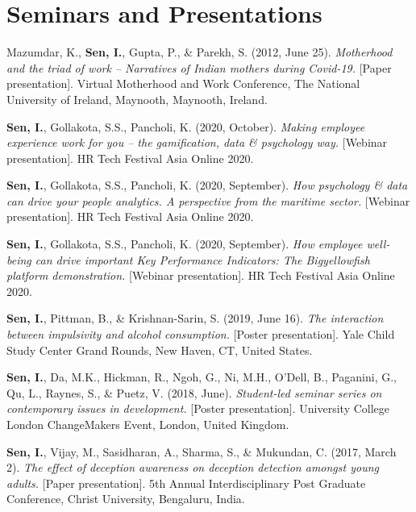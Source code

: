 \documentclass[a4paper,11pt]{article}
\begin{document}
\section{\textbf{Seminars and Presentations}}
\vspace{0.2mm}
\small{
  \begin{enumerate}[leftmargin=*, labelsep=0.5em, align=left, widest={[\textbf{S.1}]}, itemindent=0em, label={\textbf{[\arabic*]}}]
    \item Mazumdar, K., \textbf{Sen, I.}, Gupta, P., \& Parekh, S. (2012, June 25). \textit{Motherhood and the triad of work – Narratives of Indian mothers during Covid-19.} [Paper presentation].
          Virtual Motherhood and Work Conference, The National University of Ireland, Maynooth, Maynooth, Ireland.
    \item \textbf{Sen, I.}, Gollakota, S.S., Pancholi, K. (2020, October). \textit{Making employee experience work for you – the gamification, data \& psychology way.} [Webinar presentation].
          HR Tech Festival Asia Online 2020.
    \item \textbf{Sen, I.}, Gollakota, S.S., Pancholi, K. (2020, September). \textit{How psychology \& data can drive your people analytics. A perspective from the maritime sector.} [Webinar
            presentation]. HR Tech Festival Asia Online 2020.
    \item \textbf{Sen, I.}, Gollakota, S.S., Pancholi, K. (2020, September). \textit{How employee well-being can drive important Key Performance Indicators: The Bigyellowfish platform
            demonstration.} [Webinar presentation]. HR Tech Festival Asia Online 2020.
    \item \textbf{Sen, I.}, Pittman, B., \& Krishnan-Sarin, S. (2019, June 16). \textit{The interaction between impulsivity and alcohol consumption.} [Poster presentation]. Yale Child Study Center
          Grand Rounds, New Haven, CT, United States.
    \item \textbf{Sen, I.}, Da, M.K., Hickman, R., Ngoh, G., Ni, M.H., O’Dell, B., Paganini, G., Qu, L., Raynes, S., \& Puetz, V. (2018, June). \textit{Student-led seminar series on contemporary
            issues in development.} [Poster presentation]. University College London ChangeMakers Event, London, United Kingdom.
    \item \textbf{Sen, I.}, Vijay, M., Sasidharan, A., Sharma, S., \& Mukundan, C. (2017, March 2). \textit{The effect of deception awareness on deception detection amongst young adults.} [Paper
            presentation]. 5th Annual Interdisciplinary Post Graduate Conference, Christ University, Bengaluru, India.

\end{enumerate}}
\end{document}
